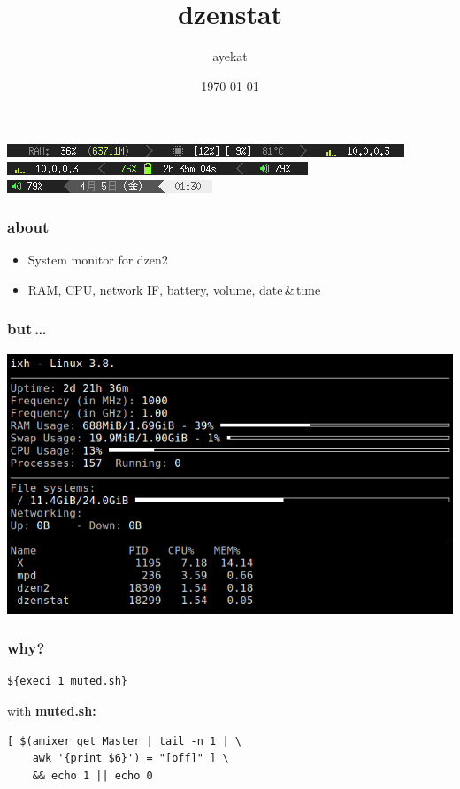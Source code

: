 \documentclass{beamer}
\title{dzenstat}
\author{ayekat}
\date{\today}
\begin{document}
\maketitle

\begin{frame}
  \begin{center}
    \includegraphics[height=.8em]{img/dzenstat1.png}\\
    \includegraphics[height=.8em]{img/dzenstat2.png}\\
    \includegraphics[height=.8em]{img/dzenstat3.png}
  \end{center}
\end{frame}

\begin{frame}
  \frametitle{about}
  \begin{itemize}
    \pause\item System monitor for dzen2
    \pause\item RAM, CPU, network IF, battery, volume, date\,\&\,time
  \end{itemize}
\end{frame}

\begin{frame}
  \frametitle{but\,\dots}
  \pause\includegraphics[width=\textwidth]{img/conky.png}
\end{frame}

\begin{frame}[fragile]
  \frametitle{why?}
  \pause
  \begin{verbatim}${execi 1 muted.sh}\end{verbatim}
  with \textbf{muted.sh:}
  \begin{verbatim}
[ $(amixer get Master | tail -n 1 | \
    awk '{print $6}') = "[off]" ] \
    && echo 1 || echo 0
  \end{verbatim}
\end{frame}
\end{document}
